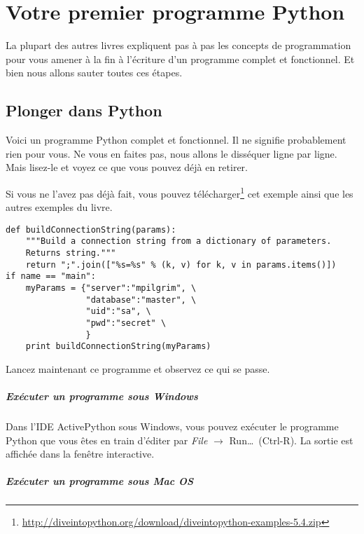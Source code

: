 \chapter{Votre premier programme Python}

La plupart des autres livres expliquent pas à pas les concepts de programmation pour vous amener à la fin à l'écriture d'un programme complet et fonctionnel. Et bien nous allons sauter toutes ces étapes.

\section{Plonger dans Python}

Voici un programme Python complet et fonctionnel. Il ne signifie probablement rien pour vous. Ne vous en faites pas, nous allons le disséquer ligne par ligne. Mais lisez-le et voyez ce que vous pouvez déjà en retirer.

\begin{example}[odbchelper.py]

Si vous ne l’avez pas déjà fait, vous pouvez télécharger\footnote{\url{http://diveintopython.org/download/diveintopython-examples-5.4.zip}} cet exemple ainsi que les autres exemples du livre.

\begin{lstlisting}
def buildConnectionString(params):
    """Build a connection string from a dictionary of parameters.
    Returns string."""
    return ";".join(["%s=%s" % (k, v) for k, v in params.items()])
if name == "main":
    myParams = {"server":"mpilgrim", \
                "database":"master", \
                "uid":"sa", \
                "pwd":"secret" \
                }
    print buildConnectionString(myParams)
\end{lstlisting}
\end{example}

Lancez maintenant ce programme et observez ce qui se passe.

\paragraph*{Exécuter un programme sous Windows }

Dans l'IDE ActivePython sous Windows, vous pouvez exécuter le programme Python que vous êtes en train d'éditer par \emph{File} $\rightarrow$ Run…~(Ctrl-R). La sortie est affichée dans la fenêtre interactive.

\paragraph*{Exécuter un programme sous Mac OS}

